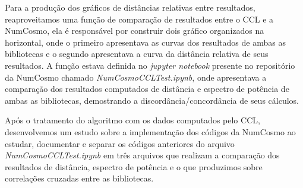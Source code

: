 Para a produção dos gráficos de distâncias relativas entre resultados, reaproveitamos uma função de comparação de resultados entre o CCL e a NumCosmo, ela é responsável por construir dois gráfico organizados na horizontal, onde o primeiro apresentava as curvas dos resultados de ambas as bibliotecas e o segundo apresentava a curva da distância relativa de seus resultados. A função estava definida no \textit{jupyter notebook} presente no repositório da NumCosmo chamado \textit{NumCosmoCCLTest.ipynb}, onde apresentava a comparação dos resultados computados de distância e espectro de potência de ambas as bibliotecas, demostrando a discordância/concordância de seus cálculos.

Após o tratamento do algoritmo com os dados computados pelo CCL, desenvolvemos um estudo sobre a implementação dos códigos da NumCosmo ao estudar, documentar e separar os códigos anteriores do arquivo \textit{NumCosmoCCLTest.ipynb} em três arquivos que realizam a comparação dos resultados de distância, espectro de potência e o que produzimos sobre correlações cruzadas entre as bibliotecas.











